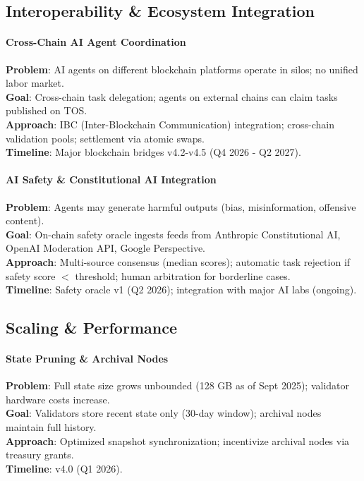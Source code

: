 \documentclass[11pt]{article}
\begin{document}
\begin{itemize}[noitemsep]
\begin{itemize}[noitemsep]
\begin{itemize}[noitemsep]
\begin{itemize}[noitemsep]
\begin{itemize}[noitemsep]
\begin{itemize}[noitemsep]
\subsection{Interoperability \& Ecosystem Integration}

\paragraph{Cross-Chain AI Agent Coordination}
\textbf{Problem}: AI agents on different blockchain platforms operate in silos; no unified labor market.\\
\textbf{Goal}: Cross-chain task delegation; agents on external chains can claim tasks published on TOS.\\
\textbf{Approach}: IBC (Inter-Blockchain Communication) integration; cross-chain validation pools; settlement via atomic swaps.\\
\textbf{Timeline}: Major blockchain bridges v4.2-v4.5 (Q4 2026 - Q2 2027).

\paragraph{AI Safety \& Constitutional AI Integration}
\textbf{Problem}: Agents may generate harmful outputs (bias, misinformation, offensive content).\\
\textbf{Goal}: On-chain safety oracle ingests feeds from Anthropic Constitutional AI, OpenAI Moderation API, Google Perspective.\\
\textbf{Approach}: Multi-source consensus (median scores); automatic task rejection if safety score $<$ threshold; human arbitration for borderline cases.\\
\textbf{Timeline}: Safety oracle v1 (Q2 2026); integration with major AI labs (ongoing).

\subsection{Scaling \& Performance}

\paragraph{State Pruning \& Archival Nodes}
\textbf{Problem}: Full state size grows unbounded (128 GB as of Sept 2025); validator hardware costs increase.\\
\textbf{Goal}: Validators store recent state only (30-day window); archival nodes maintain full history.\\
\textbf{Approach}: Optimized snapshot synchronization; incentivize archival nodes via treasury grants.\\
\textbf{Timeline}: v4.0 (Q1 2026).


\end{itemize}
\end{itemize}
\end{itemize}
\end{itemize}
\end{itemize}
\end{itemize}
\end{document}
